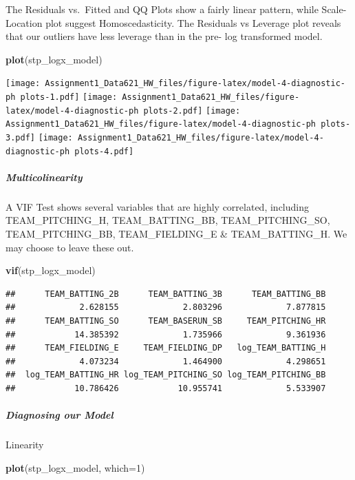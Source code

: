 \documentclass[
]{article}
\newenvironment{Shaded}{\begin{snugshade}}{\end{snugshade}}
\newcommand{\AttributeTok}[1]{\textcolor[rgb]{0.13,0.29,0.53}{#1}}
\newcommand{\DecValTok}[1]{\textcolor[rgb]{0.00,0.00,0.81}{#1}}
\newcommand{\FunctionTok}[1]{\textcolor[rgb]{0.13,0.29,0.53}{\textbf{#1}}}
\newcommand{\NormalTok}[1]{#1}
\begin{document}
The Residuals vs.~Fitted and QQ Plots show a fairly linear pattern,
while Scale-Location plot suggest Homoscedasticity. The Residuals vs
Leverage plot reveals that our outliers have less leverage than in the
pre- log transformed model.

\begin{Shaded}
\begin{Highlighting}[]
\FunctionTok{plot}\NormalTok{(stp\_logx\_model)}
\end{Highlighting}
\end{Shaded}

\texttt{[image: Assignment1\_Data621\_HW\_files/figure-latex/model-4-diagnostic-ph plots-1.pdf]}
\texttt{[image: Assignment1\_Data621\_HW\_files/figure-latex/model-4-diagnostic-ph plots-2.pdf]}
\texttt{[image: Assignment1\_Data621\_HW\_files/figure-latex/model-4-diagnostic-ph plots-3.pdf]}
\texttt{[image: Assignment1\_Data621\_HW\_files/figure-latex/model-4-diagnostic-ph plots-4.pdf]}

\subparagraph{Multicolinearity}\label{multicolinearity-1}

A VIF Test shows several variables that are highly correlated, including
TEAM\_PITCHING\_H, TEAM\_BATTING\_BB, TEAM\_PITCHING\_SO,
TEAM\_PITCHING\_BB, TEAM\_FIELDING\_E \& TEAM\_BATTING\_H. We may choose
to leave these out.

\begin{Shaded}
\begin{Highlighting}[]
\FunctionTok{vif}\NormalTok{(stp\_logx\_model)}
\end{Highlighting}
\end{Shaded}

\begin{verbatim}
##      TEAM_BATTING_2B      TEAM_BATTING_3B      TEAM_BATTING_BB 
##             2.628155             2.803296             7.877815 
##      TEAM_BATTING_SO      TEAM_BASERUN_SB     TEAM_PITCHING_HR 
##            14.385392             1.735966             9.361936 
##      TEAM_FIELDING_E     TEAM_FIELDING_DP   log_TEAM_BATTING_H 
##             4.073234             1.464900             4.298651 
##  log_TEAM_BATTING_HR log_TEAM_PITCHING_SO log_TEAM_PITCHING_BB 
##            10.786426            10.955741             5.533907
\end{verbatim}

\subparagraph{Diagnosing our Model}\label{diagnosing-our-model-3}

Linearity

\begin{Shaded}
\begin{Highlighting}[]
\FunctionTok{plot}\NormalTok{(stp\_logx\_model, }\AttributeTok{which=}\DecValTok{1}\NormalTok{)}
\end{Highlighting}
\end{Shaded}
\end{document}
